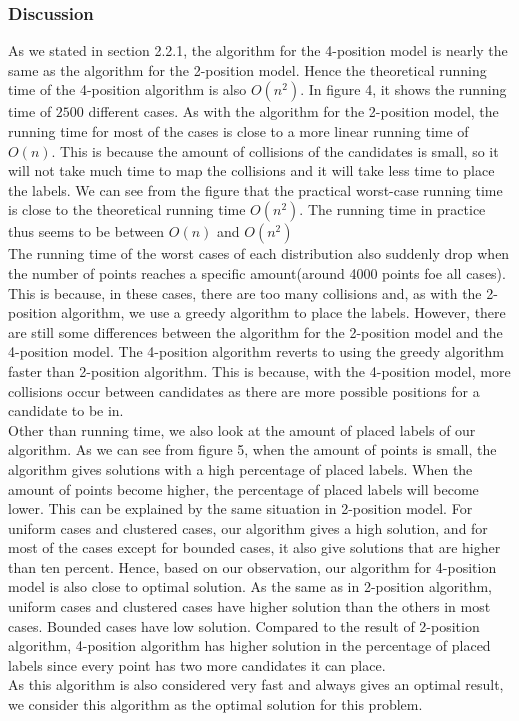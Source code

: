 \documentclass[crop=false,a4paper,oneside,11pt]{standalone}
\begin{document}
\subsubsection{Discussion}
As we stated in section 2.2.1, the algorithm for the 4-position model is nearly the same as the algorithm for the 2-position model. Hence the theoretical running time of the 4-position algorithm is also $O(n^2)$. In figure 4, it shows the running time of $2500$ different cases. As with the algorithm for the 2-position model, the running time for most of the cases is close to a more linear running time of $O(n)$. This is because the amount of collisions of the candidates is small, so it will not take much time to map the collisions and it will take less time to place the labels. We can see from the figure that the practical worst-case running time is close to the theoretical running time $O(n^2)$. The running time in practice thus seems to be between $O(n)$ and $O(n^2)$  \\
The running time of the worst cases of each distribution also suddenly drop when the number of points reaches a specific amount(around 4000 points foe all cases). This is because, in these cases, there are too many collisions and, as with the 2-position algorithm, we use a greedy algorithm to place the labels. However, there are still some differences between the algorithm for the 2-position model and the 4-position model. The 4-position algorithm reverts to using the greedy algorithm faster than 2-position algorithm. This is because, with the 4-position model, more collisions occur between candidates as there are more possible positions for a candidate to be in.\\
Other than running time, we also look at the amount of placed labels of our algorithm. As we can see from figure 5, when the amount of points is small, the algorithm gives solutions with a high percentage of placed labels. When the amount of points become higher, the percentage of placed labels will become lower. This can be explained by the same situation in 2-position model. For uniform cases and clustered cases, our algorithm gives a high solution, and for most of the cases except for bounded cases, it also give solutions that are higher than ten percent. Hence, based on our observation, our algorithm for 4-position model is also close to optimal solution. As the same as in 2-position algorithm, uniform cases and clustered cases have higher solution than the others in most cases. Bounded cases have low solution. Compared to the result of 2-position algorithm, 4-position algorithm has higher solution in the percentage of placed labels since every point has two more candidates it can place.\\
As this algorithm is also considered very fast and always gives an optimal result, we consider this algorithm as the optimal solution for this problem.\\
\end{document}

